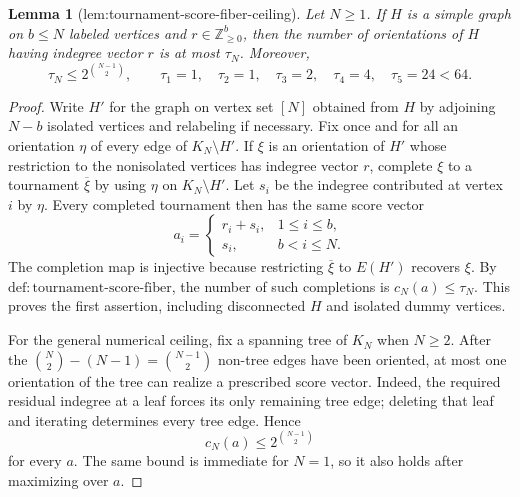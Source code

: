 \documentclass{article}
\newtheorem{lemma}{Lemma}
\begin{document}
\begin{lemma}[lem:tournament-score-fiber-ceiling]\label{lem:tournament-score-fiber-ceiling}
Let \(N\geq1\). If \(H\) is a simple graph on \(b\leq N\) labeled vertices and \(r\in\mathbb Z_{\geq0}^{b}\), then the number of orientations of \(H\) having indegree vector \(r\) is at most \(\tau_N\). Moreover,
\[
 \tau_N\leq 2^{\binom{N-1}{2}},
 \qquad
 \tau_1=1,
 \quad \tau_2=1,
 \quad \tau_3=2,
 \quad \tau_4=4,
 \quad \tau_5=24<64.
\]
\end{lemma}
\begin{proof}
Write \(H'\) for the graph on vertex set \([N]\) obtained from \(H\) by adjoining \(N-b\) isolated vertices and relabeling if necessary. Fix once and for all an orientation \(\eta\) of every edge of \(K_N\setminus H'\). If \(\xi\) is an orientation of \(H'\) whose restriction to the nonisolated vertices has indegree vector \(r\), complete \(\xi\) to a tournament \(\overline\xi\) by using \(\eta\) on \(K_N\setminus H'\). Let \(s_i\) be the indegree contributed at vertex \(i\) by \(\eta\). Every completed tournament then has the same score vector
\[
 a_i=
 \begin{cases}
 r_i+s_i,&1\leq i\leq b,\\
 s_i,&b<i\leq N.
 \end{cases}
\]
The completion map is injective because restricting \(\overline\xi\) to \(E(H')\) recovers \(\xi\). By \(\mathrm{def:tournament\mbox{-}score\mbox{-}fiber}\), the number of such completions is \(c_N(a)\leq\tau_N\). This proves the first assertion, including disconnected \(H\) and isolated dummy vertices.

For the general numerical ceiling, fix a spanning tree of \(K_N\) when \(N\geq2\). After the \(\binom N2-(N-1)=\binom{N-1}{2}\) non-tree edges have been oriented, at most one orientation of the tree can realize a prescribed score vector. Indeed, the required residual indegree at a leaf forces its only remaining tree edge; deleting that leaf and iterating determines every tree edge. Hence
\[
 c_N(a)\leq 2^{\binom{N-1}{2}}
\]
for every \(a\). The same bound is immediate for \(N=1\), so it also holds after maximizing over \(a\).


\end{proof}
\end{document}
